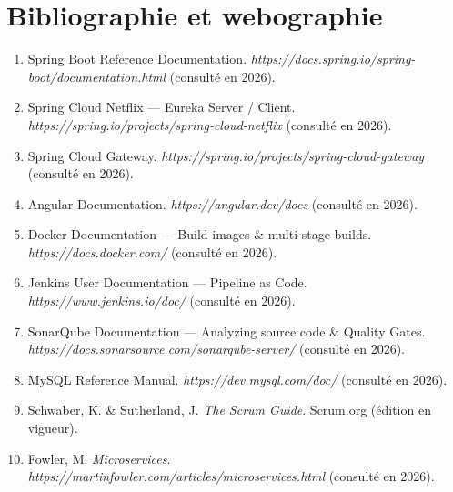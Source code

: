 \chapter*{Bibliographie et webographie}
\thispagestyle{plain}

\begin{enumerate}[leftmargin=1.8em,itemsep=0.6em]

  \item Spring Boot Reference Documentation.
        \textit{https://docs.spring.io/spring-boot/documentation.html}
        (consulté en 2026).

  \item Spring Cloud Netflix --- Eureka Server / Client.
        \textit{https://spring.io/projects/spring-cloud-netflix}
        (consulté en 2026).

  \item Spring Cloud Gateway.
        \textit{https://spring.io/projects/spring-cloud-gateway}
        (consulté en 2026).

  \item Angular Documentation.
        \textit{https://angular.dev/docs}
        (consulté en 2026).

  \item Docker Documentation --- Build images \& multi-stage builds.
        \textit{https://docs.docker.com/}
        (consulté en 2026).

  \item Jenkins User Documentation --- Pipeline as Code.
        \textit{https://www.jenkins.io/doc/}
        (consulté en 2026).

  \item SonarQube Documentation --- Analyzing source code \& Quality Gates.
        \textit{https://docs.sonarsource.com/sonarqube-server/}
        (consulté en 2026).

  \item MySQL Reference Manual.
        \textit{https://dev.mysql.com/doc/}
        (consulté en 2026).

  \item Schwaber, K. \& Sutherland, J. \textit{The Scrum Guide}.
        Scrum.org (édition en vigueur).

  \item Fowler, M. \textit{Microservices}.
        \textit{https://martinfowler.com/articles/microservices.html}
        (consulté en 2026).

\end{enumerate}

\clearpage
